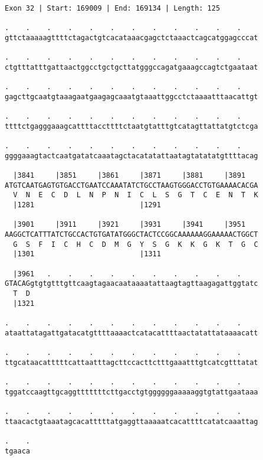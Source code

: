 \documentclass{article}
\begin{document}
\begin{Verbatim}
Exon 32 | Start: 169009 | End: 169134 | Length: 125
 
.    .    .    .    .    .    .    .    .    .    .    .    
gttctaaaaagttttctagactgtcacataaacgagctctaaactcagcatggagcccat
  
.    .    .    .    .    .    .    .    .    .    .    .    
ctgtttatttgattaactggcctgctgcttatgggccagatgaaagccagtctgaataat
  
.    .    .    .    .    .    .    .    .    .    .    .    
gagcttgcaatgtaaagaatgaagagcaaatgtaaattggcctctaaaatttaacattgt
  
.    .    .    .    .    .    .    .    .    .    .    .    
ttttctgagggaaagcattttaccttttctaatgtatttgtcatagttattatgtctcga
  
.    .    .    .    .    .    .    .    .    .    .    .    
ggggaaagtactcaatgatatcaaatagctacatatattaatagtatatatgttttacag
  
  |3841     |3851     |3861     |3871     |3881     |3891   
ATGTCAATGAGTGTGACCTGAATCCAAATATCTGCCTAAGTGGGACCTGTGAAAACACGA
  V  N  E  C  D  L  N  P  N  I  C  L  S  G  T  C  E  N  T  K
  |1281                         |1291                       
  
  |3901     |3911     |3921     |3931     |3941     |3951   
AAGGCTCATTTATCTGCCACTGTGATATGGGCTACTCCGGCAAAAAAGGAAAAACTGGCT
  G  S  F  I  C  H  C  D  M  G  Y  S  G  K  K  G  K  T  G  C
  |1301                         |1311                       
  
  |3961   .    .    .    .    .    .    .    .    .    .    
GTACAGgtgtgtttgttcaagtagaacaataaaatattaagtagttaagagattggtatc
  T  D                                                      
  |1321                                                     
  
.    .    .    .    .    .    .    .    .    .    .    .    
ataattatagattgatacatgttttaaaactcatacattttaactatattataaaacatt
  
.    .    .    .    .    .    .    .    .    .    .    .    
ttgcataacatttttcattaatttagcttccacttctttgaaatttgtcatcgtttatat
  
.    .    .    .    .    .    .    .    .    .    .    .    
tggatccaagttgcaggtttttttcttgacctgtggggggaaaaaggtgtattgaataaa
  
.    .    .    .    .    .    .    .    .    .    .    .    
ttaacactgtaaatagcacatttttatgaggttaaaaatcacattttcatatcaaattag
  
.    .
tgaaca
\end{Verbatim}
\newpage
\end{document}
